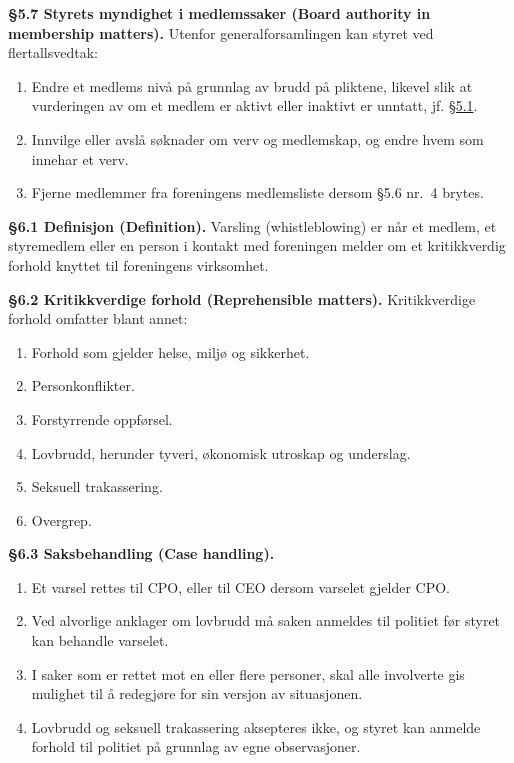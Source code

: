 \documentclass{../../../Common/Latex/Templates/rapport}
\begin{document}
\textbf{\S 5.7 Styrets myndighet i medlemssaker (Board authority in membership matters).}\label{bylaw:5.7} Utenfor generalforsamlingen kan styret ved flertallsvedtak:
\begin{enumerate}
  \item Endre et medlems nivå på grunnlag av brudd på pliktene, likevel slik at vurderingen av om et medlem er aktivt eller inaktivt er unntatt, jf. \hyperref[bylaw:5.1]{\S 5.1}.
  \item Innvilge eller avslå søknader om verv og medlemskap, og endre hvem som innehar et verv.
  \item Fjerne medlemmer fra foreningens medlemsliste dersom \S5.6 nr.\ 4 brytes.
\end{enumerate}

\label{bylaw:6}
\textbf{\S 6.1 Definisjon (Definition).}\label{bylaw:6.1} Varsling (whistleblowing) er når et medlem, et styremedlem eller en person i kontakt med foreningen melder om et kritikkverdig forhold knyttet til foreningens virksomhet.

\textbf{\S 6.2 Kritikkverdige forhold (Reprehensible matters).}\label{bylaw:6.2} Kritikkverdige forhold omfatter blant annet:
\begin{enumerate}
  \item Forhold som gjelder helse, miljø og sikkerhet.
  \item Personkonflikter.
  \item Forstyrrende oppførsel.
  \item Lovbrudd, herunder tyveri, økonomisk utroskap og underslag.
  \item Seksuell trakassering.
  \item Overgrep.
\end{enumerate}

\textbf{\S 6.3 Saksbehandling (Case handling).}\label{bylaw:6.3}
\begin{enumerate}
  \item Et varsel rettes til CPO, eller til CEO dersom varselet gjelder CPO.
  \item Ved alvorlige anklager om lovbrudd må saken anmeldes til politiet før styret kan behandle varselet.
  \item I saker som er rettet mot en eller flere personer, skal alle involverte gis mulighet til å redegjøre for sin versjon av situasjonen.
  \item Lovbrudd og seksuell trakassering aksepteres ikke, og styret kan anmelde forhold til politiet på grunnlag av egne observasjoner.
\end{enumerate}
\end{document}
